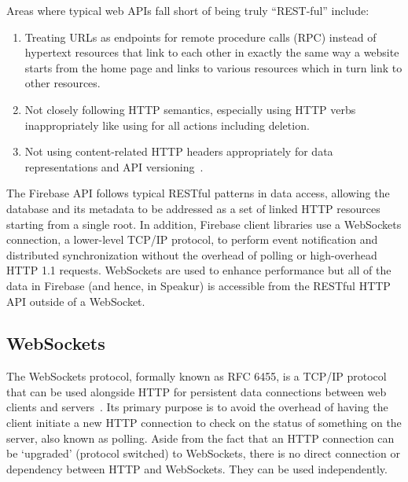 Areas where typical web APIs fall short of being truly ``REST-ful'' include:
\begin{enumerate}
\item Treating URLs as endpoints for remote procedure calls (RPC) instead of hypertext resources that link to each other in exactly the same way a website starts from the home page and links to various resources which in turn link to other resources.
\item Not closely following HTTP semantics, especially using HTTP verbs inappropriately like using  for all actions including deletion.
\item Not using content-related HTTP headers appropriately for data representations and API versioning~\cite{steveklabnik2011}.
\end{enumerate}

The Firebase API follows typical RESTful patterns in data access, allowing the database 
and its metadata to be addressed as a set of linked HTTP resources starting from a single root.
In addition, Firebase client libraries use a WebSockets connection, 
a lower-level TCP/IP protocol, 
to perform event notification and distributed synchronization without the overhead of polling or high-overhead HTTP 1.1 requests.
WebSockets are used to enhance performance but all of the data in Firebase 
(and hence, in Speakur) 
is accessible from the RESTful HTTP API outside of a WebSocket.

\subsection{WebSockets}
\label{sec:websockets}
The WebSockets protocol, formally known as RFC 6455, 
is a TCP/IP protocol that can be used alongside HTTP for persistent data connections between web clients and servers~\cite{mozillacontributors2015-a}.
Its primary purpose is to avoid the overhead of having the client initiate a new HTTP connection to check on the status of something on the server, also known as polling.
Aside from the fact that an HTTP connection can be `upgraded' (protocol switched) to WebSockets,
there is no direct connection or dependency between HTTP and WebSockets.
They can be used independently.

